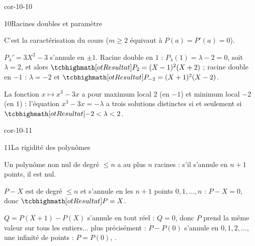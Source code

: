\begin{blocLivre}{cor-10-10}
\begin{corrige}{10}{Racines doubles et paramètre}
\begin{questions}
  \item C'est la caractérisation du cours ($m\geq2$ équivaut à
    $P(a)=P'(a)=0$).
  \item $P_\lambda'=3X^{2}-3$ s'annule en $\pm1$. Racine double en $1$ :
    $P_\lambda(1)=\lambda-2=0$, soit $\lambda=2$, et alors
    $\res{P_2=(X-1)^{2}(X+2)}$ ; racine double en $-1$ :
    $\lambda=-2$ et $\res{P_{-2}=(X+1)^{2}(X-2)}$.
  \item La fonction $x\mapsto x^{3}-3x$ a pour maximum local $2$ (en
    $-1$) et minimum local $-2$ (en $1$) : l'équation $x^{3}-3x=-\lambda$
    a trois solutions distinctes si et seulement si
    $\res{-2<\lambda<2}$.
\end{questions}
\end{corrige}
\end{blocLivre}

\begin{blocLivre}{cor-10-11}
\begin{corrige}{11}{La rigidité des polynômes}
\begin{questions}
  \item Un polynôme non nul de degré $\leq n$ a au plus $n$ racines :
    s'il s'annule en $n+1$ points, il est nul.
  \item $P-X$ est de degré $\leq n$ et s'annule en les $n+1$ points
    $0,1,\dots,n$ : $P-X=0$, donc $\res{P=X}$.
  \item $Q=P(X+1)-P(X)$ s'annule en tout réel : $Q=0$, donc $P$ prend la
    même valeur sur tous les entiers... plus précisément : $P-P(0)$
    s'annule en $0,1,2,\dots$, une infinité de points : $P=P(0)$,
    .
\end{questions}
\end{corrige}
\end{blocLivre}

